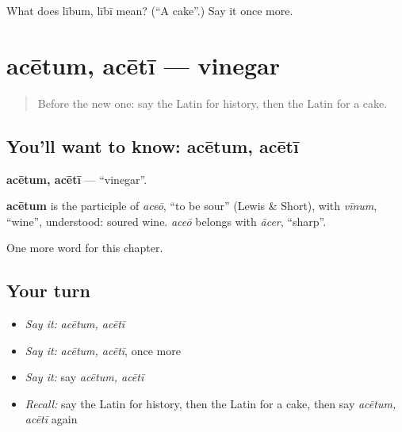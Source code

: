 \begin{tcolorbox}[breakable,colback=teal!4,colframe=teal!35!black,title={Before you move on}]
What does lībum, lībī mean? (\textquotedblleft{}A cake\textquotedblright{}.) Say it once more.
\end{tcolorbox}
\section[acētum, acētī]{acētum, acētī — vinegar}

\label{lesson:LA-C195-acetum}



\begin{quote}
Before the new one: say the Latin for history, then the Latin for a cake.
\end{quote}

\subsection*{You'll want to know: acētum, acētī}
\textbf{acētum, acētī} — \textquotedblleft{}vinegar\textquotedblright{}.

\begin{cousinweb}
\textbf{acētum} is the participle of \emph{aceō}, \textquotedblleft{}to be sour\textquotedblright{} (Lewis \& Short), with \emph{vīnum}, \textquotedblleft{}wine\textquotedblright{}, understood: soured wine. \emph{aceō} belongs with \emph{ācer}, \textquotedblleft{}sharp\textquotedblright{}.
\end{cousinweb}

\begin{grammarlens}[title={What you've built}]
One more word for this chapter.
\end{grammarlens}

\subsection*{Your turn}
\begin{itemize}
\raggedright
  \item \emph{Say it:} \emph{acētum, acētī}
  \item \emph{Say it:} \emph{acētum, acētī}, once more
  \item \emph{Say it:} say \emph{acētum, acētī}
  \item \emph{Recall:} say the Latin for history, then the Latin for a cake, then say \emph{acētum, acētī} again
\end{itemize}

